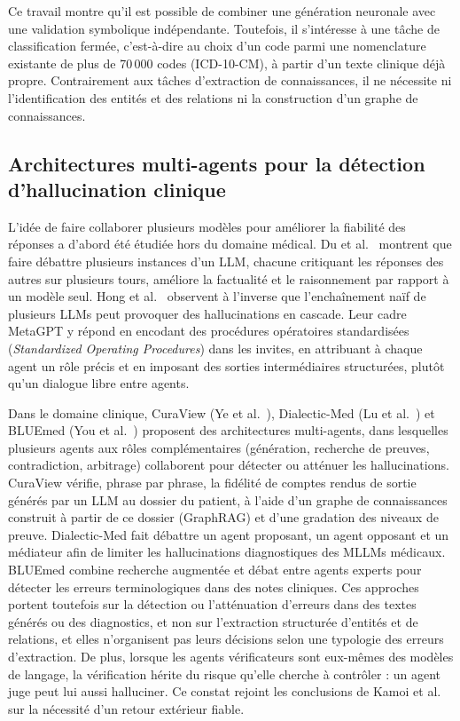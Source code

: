 Ce travail montre qu'il est possible de combiner une génération neuronale avec une validation symbolique indépendante. Toutefois, il s'intéresse à une tâche de classification fermée, c'est-à-dire au choix d'un code parmi une nomenclature existante de plus de 70\,000 codes (ICD-10-CM), à partir d'un texte clinique déjà propre. Contrairement aux tâches d'extraction de connaissances, il ne nécessite ni l'identification des entités et des relations ni la construction d'un graphe de connaissances.

\subsection{Architectures multi-agents pour la détection d'hallucination clinique}

L'idée de faire collaborer plusieurs modèles pour améliorer la fiabilité des réponses a d'abord été étudiée hors du domaine médical. Du et al.~\cite{du2024debate} montrent que faire débattre plusieurs instances d'un LLM, chacune critiquant les réponses des autres sur plusieurs tours, améliore la factualité et le raisonnement par rapport à un modèle seul. Hong et al.~\cite{hong2024metagpt} observent à l'inverse que l'enchaînement naïf de plusieurs LLMs peut provoquer des hallucinations en cascade. Leur cadre MetaGPT y répond en encodant des procédures opératoires standardisées (\textit{Standardized Operating Procedures}) dans les invites, en attribuant à chaque agent un rôle précis et en imposant des sorties intermédiaires structurées, plutôt qu'un dialogue libre entre agents.

Dans le domaine clinique, CuraView (Ye et al.~\cite{ye2026curaview}), Dialectic-Med (Lu et al.~\cite{lu2026dialectic}) et BLUEmed (You et al.~\cite{you2026bluemed}) proposent des architectures multi-agents, dans lesquelles plusieurs agents aux rôles complémentaires (génération, recherche de preuves, contradiction, arbitrage) collaborent pour détecter ou atténuer les hallucinations. CuraView vérifie, phrase par phrase, la fidélité de comptes rendus de sortie générés par un LLM au dossier du patient, à l'aide d'un graphe de connaissances construit à partir de ce dossier (GraphRAG) et d'une gradation des niveaux de preuve. Dialectic-Med fait débattre un agent proposant, un agent opposant et un médiateur afin de limiter les hallucinations diagnostiques des MLLMs médicaux. BLUEmed combine recherche augmentée et débat entre agents experts pour détecter les erreurs terminologiques dans des notes cliniques. Ces approches portent toutefois sur la détection ou l'atténuation d'erreurs dans des textes générés ou des diagnostics, et non sur l'extraction structurée d'entités et de relations, et elles n'organisent pas leurs décisions selon une typologie des erreurs d'extraction. De plus, lorsque les agents vérificateurs sont eux-mêmes des modèles de langage, la vérification hérite du risque qu'elle cherche à contrôler : un agent juge peut lui aussi halluciner. Ce constat rejoint les conclusions de Kamoi et al.~\cite{kamoi2024selfcorrection} sur la nécessité d'un retour extérieur fiable.

